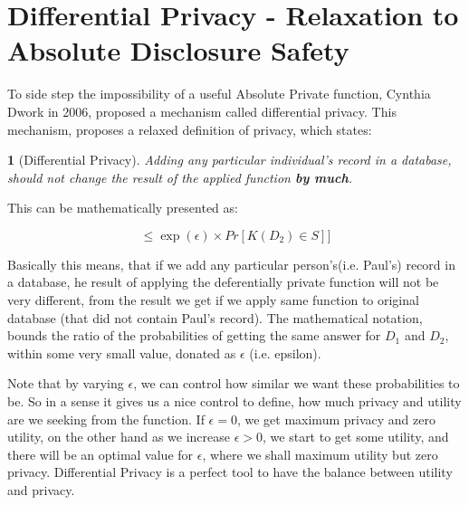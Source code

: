 \documentclass[12pt]{report}
\theoremstyle{named}
\newtheorem*{namedtheorem}{}
\begin{document}
\section{Differential Privacy - Relaxation to Absolute Disclosure Safety}
\label{sec:RelaxationToAbsolute}
To side step the impossibility of a useful Absolute Private function,  Cynthia Dwork in 2006, proposed a mechanism called differential privacy.  This mechanism, proposes a relaxed definition of privacy, which states:

\begin{namedtheorem}[Differential Privacy\cite{Dwork:2006:DP:2097282.2097284}]
Adding any particular individual's record in a database, should not change the result of the applied function \textbf{by much}.
\end{namedtheorem}

This can be mathematically presented as:

\begin{equation}
[Pr[\mathit{K}(D_{1})\in S] \leq \exp (\epsilon ) \times Pr[\mathit{K}(D_{2})\in S]] \end{equation}


Basically this means, that if we add any particular person's(i.e. Paul's) record in a database, he result of applying the deferentially private function will not be very different, from the result we get if we apply same function to original database (that did not contain Paul's record). The mathematical notation, bounds the ratio of the probabilities of getting the same answer for $D_{1}$ and $D_2$, within some very small value, donated as $\epsilon$ (i.e. epsilon).

Note that by varying $\epsilon$, we can control how similar we want these probabilities to be. So in a sense it gives us a nice control to define, how much privacy and utility are we seeking from the function. If $\epsilon = 0$, we get maximum privacy and zero utility, on the other hand as we increase $\epsilon > 0$, we start to get some utility, and there will be an optimal value for $\epsilon$, where we shall maximum utility but zero privacy. Differential Privacy is a perfect tool to have the balance between utility and privacy.
\end{document}
